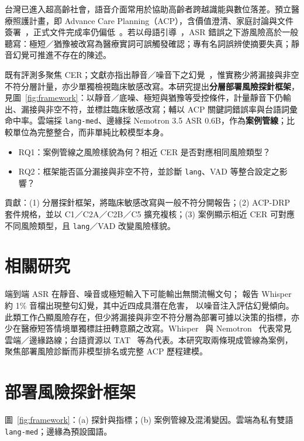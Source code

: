\documentclass[11pt,a4paper]{article}
\newcommand{\LangMVOne}{\texttt{lang-med}}
\begin{document}
台灣已進入超高齡社會，語音介面常用於協助高齡者跨越識能與數位落差。預立醫療照護計畫，即 Advance Care Planning（ACP），含價值澄清、家庭討論與文件簽署~\citep{schickedanz2009acp}，正式文件完成率仍偏低~\citep{lo2025acp}。若以母語引導~\citep{scheerens2021ehealth}，ASR 錯誤之下游風險高於一般聽寫：極短／猶豫被改寫為醫療實詞可誤觸發確認；專有名詞誤辨使摘要失真；靜音幻覺可推進不存在的陳述。

既有評測多聚焦 CER；文獻亦指出靜音／噪音下之幻覺~\citep{koenecke2024careless,frieske2024hallucination}，惟實務少將漏接與非空不符分層計量，亦少單獨檢視臨床敏感改寫。本研究提出\textbf{分層部署風險探針框架}，見圖~\ref{fig:framework}：以靜音／底噪、極短與猶豫等受控條件，計量靜音下仍輸出、漏接與非空不符，並標註臨床敏感改寫；輔以 ACP 關鍵詞錯誤率與台語詞彙命中率。雲端採 \texttt{lang-med}、邊緣採 Nemotron 3.5 ASR 0.6B，作為\textbf{案例管線}；比較單位為完整整合，而非單純比較模型本身。

\begin{itemize}
  \item RQ1：案例管線之風險樣貌為何？相近 CER 是否對應相同風險類型？
  \item RQ2：框架能否區分漏接與非空不符，並診斷 \texttt{lang}、VAD 等整合設定之影響？
\end{itemize}

貢獻：(1) 分層探針框架，將臨床敏感改寫與一般不符分開報告；(2) ACP-DRP 套件規格，並以 C1／C2A／C2B／C5 擴充複核；(3) 案例顯示相近 CER 可對應不同風險類型，且 \texttt{lang}／VAD 改變風險樣貌。

\section{相關研究}

端到端 ASR 在靜音、噪音或極短輸入下可能輸出無關流暢文句；\citet{koenecke2024careless} 報告 Whisper 約 1\% 音檔出現整句幻覺，其中近四成具潛在危害，\citet{frieske2024hallucination} 以噪音注入評估幻覺傾向。此類工作凸顯風險存在，但少將漏接與非空不符分層為部署可據以決策的指標，亦少在醫療短答情境單獨標註扭轉意願之改寫。Whisper~\citep{radford2023whisper} 與 Nemotron~\citep{nvidia2026nemotron} 代表常見雲端／邊緣路線；台語資源以 TAT~\citep{liao2020tat} 等為代表。本研究取兩條現成管線為案例，聚焦部署風險診斷而非模型排名或完整 ACP 歷程建模。

\section{部署風險探針框架}

圖~\ref{fig:framework}：(a) 探針與指標；(b) 案例管線及混淆變因。雲端為私有雙語 \LangMVOne{}；邊緣為預設國語。
\end{document}
